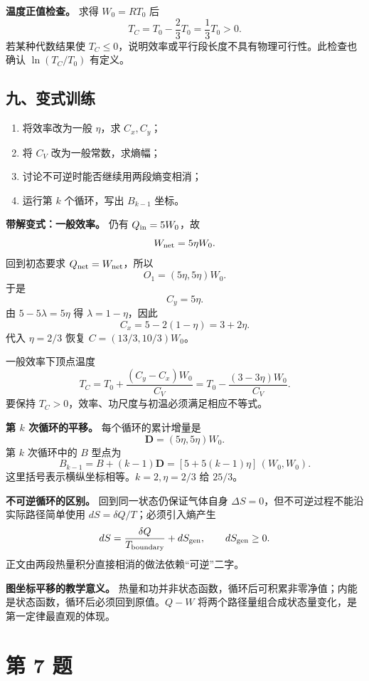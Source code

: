 \documentclass[12pt,a4paper,UTF8]{ctexart}
\newcommand{\tightlist}{\setlength{\itemsep}{0pt}\setlength{\parskip}{0pt}}
\begin{document}
\textbf{温度正值检查。} 求得 \(W_0=RT_0\) 后 \[
T_C=T_0-\frac23T_0=\frac13T_0>0.
\] 若某种代数结果使
\(T_C\le0\)，说明效率或平行段长度不具有物理可行性。此检查也确认
\(\ln(T_C/T_0)\) 有定义。

\subsection{九、变式训练}\label{ux4e5dux53d8ux5f0fux8badux7ec3-5}

\begin{enumerate}
\def\labelenumi{\arabic{enumi}.}
\tightlist
\item
  将效率改为一般 \(\eta\)，求 \(C_x,C_y\)；
\item
  将 \(C_V\) 改为一般常数，求熵幅；
\item
  讨论不可逆时能否继续用两段熵变相消；
\item
  运行第 \(k\) 个循环，写出 \(B_{k-1}\) 坐标。
\end{enumerate}

\textbf{带解变式：一般效率。} 仍有 \(Q_{\rm in}=5W_0\)，故 \[
W_{\rm net}=5\eta W_0.
\] 回到初态要求 \(Q_{\rm net}=W_{\rm net}\)，所以 \[
O_1=(5\eta,5\eta)W_0.
\] 于是 \[
\boxed{C_y=5\eta}. \tag{11}
\] 由 \(5-5\lambda=5\eta\) 得 \(\lambda=1-\eta\)，因此 \[
\boxed{C_x=5-2(1-\eta)=3+2\eta}. \tag{12}
\] 代入 \(\eta=2/3\) 恢复 \(C=(13/3,10/3)W_0\)。

一般效率下顶点温度 \[
T_C=T_0+\frac{(C_y-C_x)W_0}{C_V}
=T_0-\frac{(3-3\eta)W_0}{C_V}.
\] 要保持 \(T_C>0\)，效率、功尺度与初温必须满足相应不等式。

\textbf{第 \(k\) 次循环的平移。} 每个循环的累计增量是 \[
\bm D=(5\eta,5\eta)W_0.
\] 第 \(k\) 次循环中的 \(B\) 型点为 \[
\boxed{
B_{k-1}=B+(k-1)\bm D
=[5+5(k-1)\eta]\,(W_0,W_0)
}. \tag{13}
\] 这里括号表示横纵坐标相等。\(k=2,\eta=2/3\) 给 \(25/3\)。

\textbf{不可逆循环的区别。} 回到同一状态仍保证气体自身
\(\Delta S=0\)，但不可逆过程不能沿实际路径简单使用
\(dS=\delta Q/T\)；必须引入熵产生 \[
dS=\frac{\delta Q}{T_{\rm boundary}}+dS_{\rm gen},
\qquad dS_{\rm gen}\ge0.
\] 正文由两段热量积分直接相消的做法依赖``可逆''二字。

\textbf{图坐标平移的教学意义。}
热量和功并非状态函数，循环后可积累非零净值；内能是状态函数，循环后必须回到原值。\(Q-W\)
将两个路径量组合成状态量变化，是第一定律最直观的体现。

\newpage

\section{第 7 题}\label{ux7b2c-7-ux9898}
\end{document}

